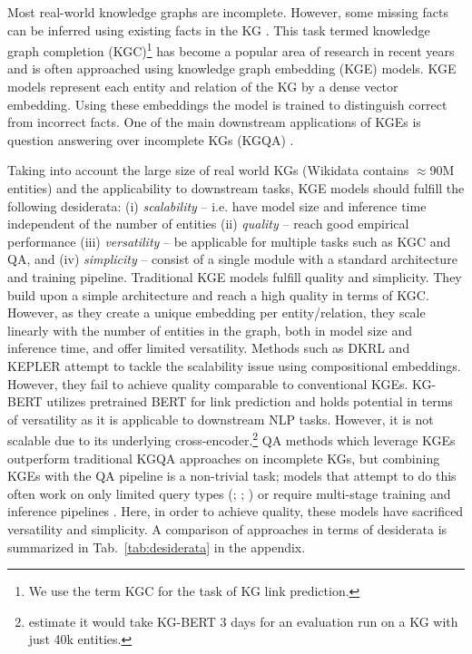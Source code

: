 \documentclass[11pt]{article}
\renewcommand\:{\colon} \newcommand{\sset}[1]{\left\{\,#1\,\right\}} \newcommand{\ssets}[1]{\left\{#1\right\}} \newcommand{\ssetn}[1]{\{\,#1\,\}}
\begin{document}
Most real-world knowledge graphs are incomplete.
However, some missing facts can be inferred using existing facts in the KG \cite{bordes2013translating}. 
This task termed knowledge graph completion (KGC)\footnote{We use the term KGC for the task of KG link prediction.} has become a popular area of research in recent years \cite{kge_survey} and is often approached using knowledge graph embedding (KGE) models.
KGE models represent each entity and relation of the KG by a dense vector embedding. 
Using these embeddings the model is trained to distinguish correct from incorrect facts.
One of the main downstream applications of KGEs is question answering over incomplete KGs (KGQA) \cite{kge_application_survey}. 

Taking into account the large size of real world KGs (Wikidata contains $\approx$90M entities) and the applicability to downstream tasks, KGE models
should fulfill the following desiderata: 
(i) \emph{scalability} -- i.e. have model size and inference time independent of the number of entities 
(ii) \emph{quality} -- reach good empirical performance
(iii) \emph{versatility} -- be applicable for multiple tasks such as KGC and QA, and 
(iv) \emph{simplicity} -- consist of a single module with a standard architecture and training pipeline.
Traditional KGE models fulfill quality and simplicity. 
They build upon a simple architecture and reach a high quality in terms of KGC.
However, as they create a unique embedding per entity/relation, they scale linearly with the number of entities in the graph, both in model size and inference time, and offer limited versatility.
Methods such as DKRL \cite{Xie_Liu_Jia_Luan_Sun_2016} and KEPLER \cite{wang2021KEPLER} attempt to tackle the scalability issue using compositional embeddings.
However, they fail to achieve quality comparable to conventional KGEs. 
KG-BERT \cite{kg-bert} utilizes pretrained BERT for link prediction and holds potential in terms of versatility as it is applicable to downstream NLP tasks. 
However, it is not scalable due to its underlying cross-encoder.\footnote{
    \citet{time-taken-kgbert} estimate it would take KG-BERT 3 days for an evaluation run on a KG with just 40k entities.
}
QA methods which leverage KGEs outperform traditional KGQA approaches on incomplete KGs, but combining KGEs with the QA pipeline is a non-trivial task;
models that attempt to do this often work on only limited query types (\citealt{huang2019knowledge}; 
\citealt{sun2021faithful}; \citealt{saxena2020improving}) or require multi-stage training and inference pipelines \cite{ren2021lego}.
Here, in order to achieve quality, these models have sacrificed versatility and simplicity.
A comparison of approaches in terms of desiderata is summarized in Tab.~\ref{tab:desiderata} in the appendix.
\end{document}
